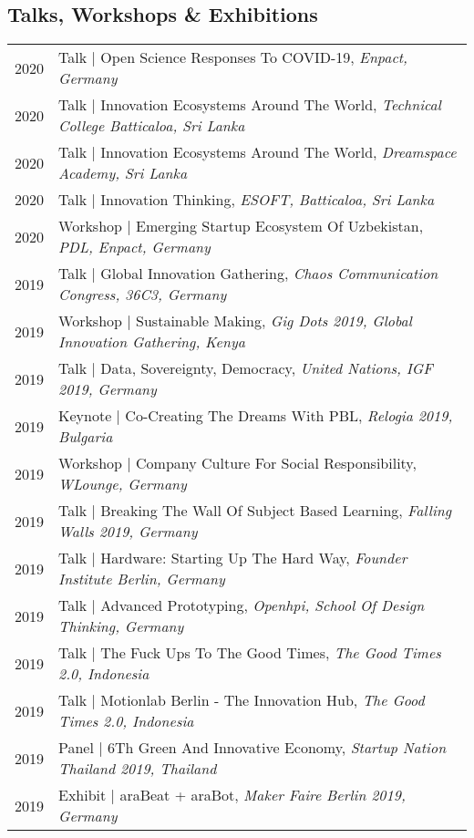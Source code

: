 \subsection{Talks, Workshops \& Exhibitions}
\begin{longtable}
	{r|p{13cm}}
	\textsc{2020} & Talk | Open Science Responses To COVID-19, \emph{Enpact, Germany}\\
	\textsc{2020} & Talk | Innovation Ecosystems Around The World, \emph{Technical College Batticaloa, Sri Lanka}\\
	\textsc{2020} & Talk | Innovation Ecosystems Around The World, \emph{Dreamspace Academy, Sri Lanka}\\
	\textsc{2020} & Talk | Innovation Thinking, \emph{ESOFT, Batticaloa, Sri Lanka}\\
	\textsc{2020} & Workshop | Emerging Startup Ecosystem Of Uzbekistan, \emph{PDL, Enpact, Germany}\\
	\textsc{2019} & Talk | Global Innovation Gathering, \emph{Chaos Communication Congress, 36C3, Germany}\\
	\textsc{2019} & Workshop | Sustainable Making, \emph{Gig Dots 2019, Global Innovation Gathering, Kenya}\\
	\textsc{2019} & Talk | Data, Sovereignty, Democracy, \emph{United Nations, IGF 2019, Germany}\\
	\textsc{2019} & Keynote | Co-Creating The Dreams With PBL, \emph{Relogia 2019, Bulgaria}\\
	\textsc{2019} & Workshop | Company Culture For Social Responsibility, \emph{WLounge, Germany}\\
	\textsc{2019} & Talk | Breaking The Wall Of Subject Based Learning, \emph{Falling Walls 2019, Germany}\\
	\textsc{2019} & Talk | Hardware: Starting Up The Hard Way, \emph{Founder Institute Berlin, Germany}\\
	\textsc{2019} & Talk | Advanced Prototyping, \emph{Openhpi, School Of Design Thinking, Germany}\\
	\textsc{2019} & Talk | The Fuck Ups To The Good Times, \emph{The Good Times 2.0, Indonesia}\\
	\textsc{2019} & Talk | Motionlab Berlin - The Innovation Hub, \emph{The Good Times 2.0, Indonesia}\\
	\textsc{2019} & Panel | 6Th Green And Innovative Economy, \emph{Startup Nation Thailand 2019, Thailand}\\
	\textsc{2019} & Exhibit | araBeat + araBot, \emph{Maker Faire Berlin 2019, Germany}\\

\end{longtable}
